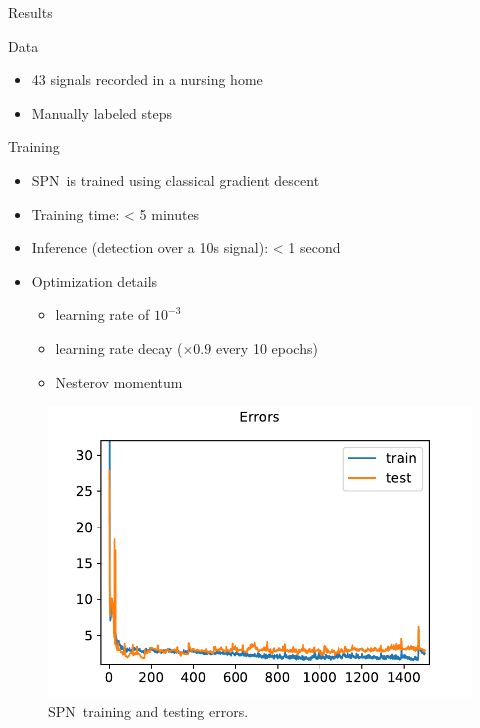 \documentclass[9pt,t,aspectratio=1610]{beamer}
\newcommand{\subalgo}{{\small\textsc{SPN}}\ }
\begin{document}
\begin{frame}{Results}
\begin{minipage}[t]{0.45\linewidth}
    Data
    \begin{itemize}
        \item 43 signals recorded in a nursing home
        \item Manually labeled steps
    \end{itemize}
    Training
    \begin{itemize}
        \item \subalgo is trained using classical gradient descent
        \item Training time: < 5 minutes
        \item Inference (detection over a 10s signal): < 1 second
        \item Optimization details
        \begin{itemize}
            \item learning rate of $10^{-3}$
            \item learning rate decay ($\times 0.9$ every 10 epochs)
            \item Nesterov momentum
        \end{itemize}
    \end{itemize}
\end{minipage}\hfill
\begin{minipage}[t]{0.5\linewidth}
    \begin{figure}[h]
            \centering
            \includegraphics[width=\linewidth]{spn_train_test_errors.pdf}
        \caption{\subalgo training and testing errors.}
    \end{figure}
\end{minipage}
\end{frame}
\end{document}
